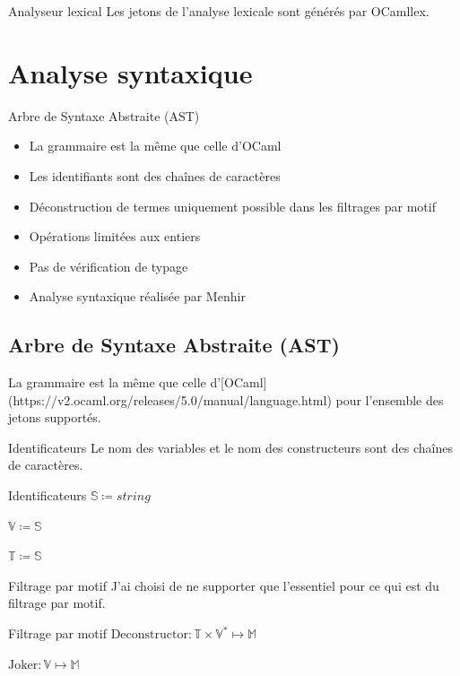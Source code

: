 \documentclass{beamer}
\begin{document}
\begin{frame}{Analyseur lexical}
    Les jetons de l'analyse lexicale sont générés par OCamllex.
\end{frame}
\fi

\section{Analyse syntaxique}

\begin{frame}{Arbre de Syntaxe Abstraite (AST)}
    \begin{itemize}
        \item La grammaire est la même que celle d'OCaml
        \item Les identifiants sont des chaînes de caractères
        \item Déconstruction de termes uniquement possible dans les filtrages par motif
        \item Opérations limitées aux entiers
        \item Pas de vérification de typage
        \item Analyse syntaxique réalisée par Menhir
    \end{itemize}
\end{frame}

\iffalse
\subsection{Arbre de Syntaxe Abstraite (AST)}

La grammaire est la même que celle d'[OCaml](https://v2.ocaml.org/releases/5.0/manual/language.html) pour l'ensemble des jetons supportés.

\begin{frame}{Identificateurs}
    Le nom des variables et le nom des constructeurs sont des chaînes de caractères.

    \begin{block}{Identificateurs}
        $\mathbb{S} \coloneqq string$%

        $\mathbb{V} \coloneqq \mathbb{S}$%

        $\mathbb{T} \coloneqq \mathbb{S}$%
    \end{block}
\end{frame}

\begin{frame}{Filtrage par motif}
    J'ai choisi de ne supporter que l'essentiel pour ce qui est du filtrage par motif.%
    
    \begin{block}{Filtrage par motif}
        $\text{Deconstructor} : \mathbb{T} \times \mathbb{V}^{*} \mapsto \mathbb{M}$%

        $\text{Joker} : \mathbb{V} \mapsto \mathbb{M}$%
    \end{block}
\end{frame}
\end{document}
